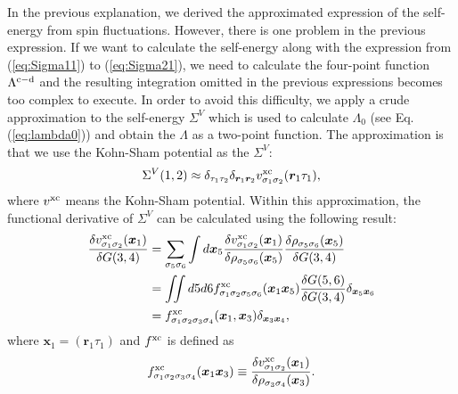 In the previous explanation, we derived the approximated expression of the self-energy from spin fluctuations.
However, there is one problem in the previous expression.
If we want to calculate the self-energy along with the expression from (\ref{eq:Sigma11}) to (\ref{eq:Sigma21}), 
we need to calculate the four-point function $\Lambda^{\rm c - \rm d}$ and the resulting integration omitted in the previous expressions becomes 
too complex to execute.
In order to avoid this difficulty, we apply a crude approximation to the
self-energy $\Sigma^{V}$ which is used to calculate $\Lambda_0$ (see Eq.(\ref{eq:lambda0})) and obtain the $\Lambda$ as a two-point function.
The approximation is that we use the Kohn-Sham potential as the $\Sigma^{V}$\cite{Sole1994}:
%
\begin{equation}
	\Sigma^{V}(1,2) \approx \delta_{\tau_1\tau_2}\delta_{\bm r_1\bm r_2}
	v^{\rm xc}_{\sigma_1\sigma_2}(\bm r_1 \tau_1),
	\label{eq:localapp}
\end{equation}
%
where $v^{\rm xc}$ means the Kohn-Sham potential.
Within this approximation, the functional derivative of $\Sigma^{V}$
can be calculated using the following result:
%
\begin{equation}
\begin{split}
	\frac{\delta v^{\rm xc}_{\sigma_1\sigma_2}(\bm x_1)}{\delta G(3,4)}
	&= \sum_{\sigma_5\sigma_6} \int d{\bm x}_5 
	\frac{\delta v^{\rm xc}_{\sigma_1\sigma_2}(\bm x_1)}{\delta\rho_{\sigma_5\sigma_6}(\bm x_5)}
	\frac{\delta\rho_{\sigma_5\sigma_6}(\bm x_5)}{\delta G(3,4)} \\
	&= \iint d5d6 f^{\rm xc}_{\sigma_1\sigma_2\sigma_5\sigma_6}(\bm x_1 \bm x_5)
	\frac{\delta G(5,6)}{\delta G(3,4)}\delta_{\bm x_5\bm x_6} \\
	&= f^{\rm xc}_{\sigma_1\sigma_2\sigma_3\sigma_4}(\bm x_1, \bm x_3)\delta_{\bm x_3 \bm x_4},
	\label{eq:dervxc}
\end{split}
\end{equation}
%
where $\bm x_1 = (\bm r_1 \tau_1)$ and $f^{\rm xc}$ is defined as
%
\begin{equation}
	f^{\rm xc}_{\sigma_1\sigma_2\sigma_3\sigma_4}(\bm x_1 \bm x_3)
	\equiv 
	\frac{\delta v^{\rm xc}_{\sigma_1\sigma_2}(\bm x_1)}{\delta\rho_{\sigma_3\sigma_4}(\bm x_3)}.
	\label{eq:deffxc}
\end{equation}
%

